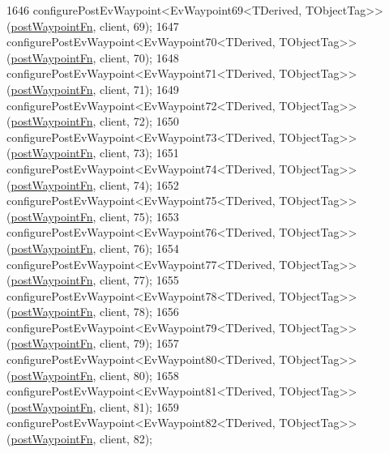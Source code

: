 \begin{DoxyCode}
1646     configurePostEvWaypoint<EvWaypoint69<TDerived, TObjectTag>>(\hyperlink{classmove__base__z__client_1_1WaypointEventDispatcher_acc538eb7506c13f7cca2268a1742dadd}{postWaypointFn}, client, 69);
1647     configurePostEvWaypoint<EvWaypoint70<TDerived, TObjectTag>>(\hyperlink{classmove__base__z__client_1_1WaypointEventDispatcher_acc538eb7506c13f7cca2268a1742dadd}{postWaypointFn}, client, 70);
1648     configurePostEvWaypoint<EvWaypoint71<TDerived, TObjectTag>>(\hyperlink{classmove__base__z__client_1_1WaypointEventDispatcher_acc538eb7506c13f7cca2268a1742dadd}{postWaypointFn}, client, 71);
1649     configurePostEvWaypoint<EvWaypoint72<TDerived, TObjectTag>>(\hyperlink{classmove__base__z__client_1_1WaypointEventDispatcher_acc538eb7506c13f7cca2268a1742dadd}{postWaypointFn}, client, 72);
1650     configurePostEvWaypoint<EvWaypoint73<TDerived, TObjectTag>>(\hyperlink{classmove__base__z__client_1_1WaypointEventDispatcher_acc538eb7506c13f7cca2268a1742dadd}{postWaypointFn}, client, 73);
1651     configurePostEvWaypoint<EvWaypoint74<TDerived, TObjectTag>>(\hyperlink{classmove__base__z__client_1_1WaypointEventDispatcher_acc538eb7506c13f7cca2268a1742dadd}{postWaypointFn}, client, 74);
1652     configurePostEvWaypoint<EvWaypoint75<TDerived, TObjectTag>>(\hyperlink{classmove__base__z__client_1_1WaypointEventDispatcher_acc538eb7506c13f7cca2268a1742dadd}{postWaypointFn}, client, 75);
1653     configurePostEvWaypoint<EvWaypoint76<TDerived, TObjectTag>>(\hyperlink{classmove__base__z__client_1_1WaypointEventDispatcher_acc538eb7506c13f7cca2268a1742dadd}{postWaypointFn}, client, 76);
1654     configurePostEvWaypoint<EvWaypoint77<TDerived, TObjectTag>>(\hyperlink{classmove__base__z__client_1_1WaypointEventDispatcher_acc538eb7506c13f7cca2268a1742dadd}{postWaypointFn}, client, 77);
1655     configurePostEvWaypoint<EvWaypoint78<TDerived, TObjectTag>>(\hyperlink{classmove__base__z__client_1_1WaypointEventDispatcher_acc538eb7506c13f7cca2268a1742dadd}{postWaypointFn}, client, 78);
1656     configurePostEvWaypoint<EvWaypoint79<TDerived, TObjectTag>>(\hyperlink{classmove__base__z__client_1_1WaypointEventDispatcher_acc538eb7506c13f7cca2268a1742dadd}{postWaypointFn}, client, 79);
1657     configurePostEvWaypoint<EvWaypoint80<TDerived, TObjectTag>>(\hyperlink{classmove__base__z__client_1_1WaypointEventDispatcher_acc538eb7506c13f7cca2268a1742dadd}{postWaypointFn}, client, 80);
1658     configurePostEvWaypoint<EvWaypoint81<TDerived, TObjectTag>>(\hyperlink{classmove__base__z__client_1_1WaypointEventDispatcher_acc538eb7506c13f7cca2268a1742dadd}{postWaypointFn}, client, 81);
1659     configurePostEvWaypoint<EvWaypoint82<TDerived, TObjectTag>>(\hyperlink{classmove__base__z__client_1_1WaypointEventDispatcher_acc538eb7506c13f7cca2268a1742dadd}{postWaypointFn}, client, 82);

\end{DoxyCode}
